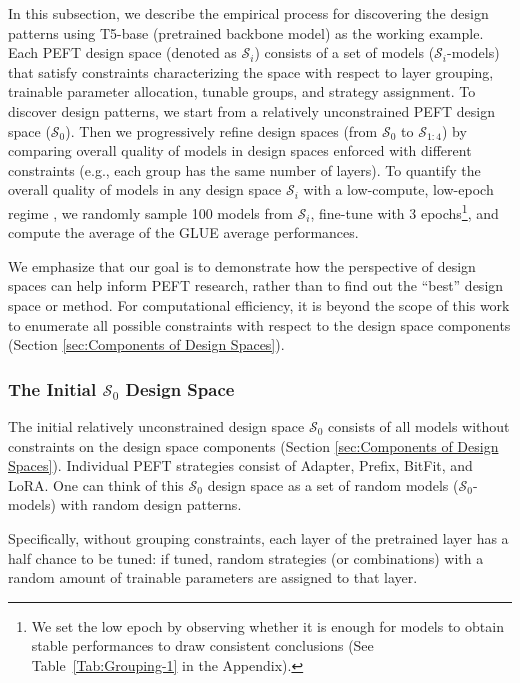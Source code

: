 In this subsection, we describe the empirical process for discovering the design patterns using T5-base (pretrained backbone model) as the working example. Each PEFT design space (denoted as $\mathcal{S}_i$) consists of a set of models ($\mathcal{S}_i$-models) that satisfy constraints characterizing the space  with respect to layer grouping, trainable parameter allocation, tunable groups, and strategy assignment. To discover design patterns, we start from a relatively unconstrained PEFT design space ($\mathcal{S}_0$). Then we progressively refine design spaces (from $\mathcal{S}_0$ to $\mathcal{S}_{1:4}$) by comparing overall quality of models in design spaces enforced with different constraints (e.g., each group has the same number of layers). To quantify the overall quality of models in any design space $\mathcal{S}_i$
with a low-compute, low-epoch regime \citep{https://doi.org/10.48550/arxiv.2003.13678}, we randomly sample 100 models from $\mathcal{S}_i$, fine-tune with 3 epochs\footnote{We set the low epoch by observing whether it is enough for models to obtain stable performances to draw consistent conclusions (See Table~\ref{Tab:Grouping-1} in the Appendix).}, and compute the average of the GLUE average performances.

We emphasize that our goal is to demonstrate how the perspective of design spaces can help inform PEFT research, rather than to find out the ``best'' design space or method. For computational efficiency, it is beyond the scope of  this work to enumerate all possible constraints with respect to the design space components (Section \ref{sec:Components of Design Spaces}).

\subsubsection{The Initial $\mathcal{S}_0$ Design Space} The initial relatively unconstrained design space $\mathcal{S}_0$ consists of all models without constraints  on the design space components (Section \ref{sec:Components of Design Spaces}). Individual PEFT strategies consist of Adapter, Prefix, BitFit, and LoRA. One can think of this $\mathcal{S}_0$ design space as a set of random models ($\mathcal{S}_0$-models) with random design patterns.

Specifically, without grouping constraints, each layer of the pretrained layer has a half chance to be tuned: if tuned, random strategies (or combinations) with a random amount of trainable parameters are assigned to that layer.

